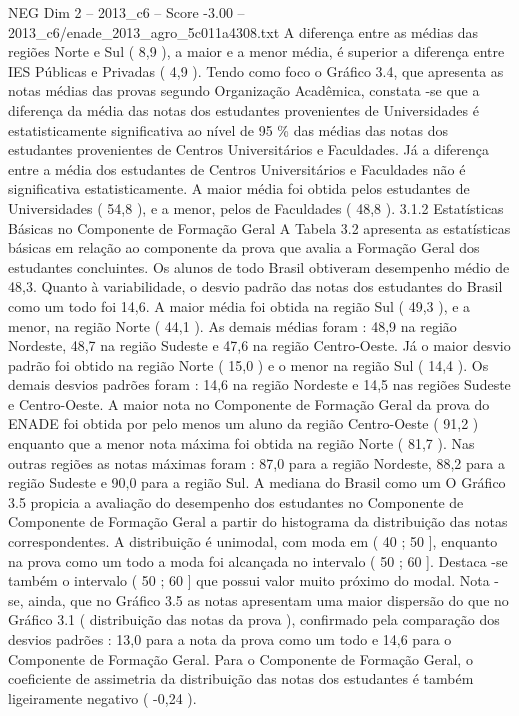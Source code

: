 \begin{textsample}{NEG Dim 2 – 2013\_c6 – Score -3.00 – 2013\_c6/enade\_2013\_agro\_5c011a4308.txt}
A diferença entre as médias das regiões Norte e Sul ( 8,9 ), a maior e a menor média, é superior a diferença entre IES Públicas e Privadas ( 4,9 ).
Tendo como foco o Gráfico 3.4, que apresenta as notas médias das provas segundo Organização Acadêmica, constata -se que a diferença da média das notas dos estudantes provenientes de Universidades é estatisticamente significativa ao nível de 95 \% das médias das notas dos estudantes provenientes de Centros Universitários e Faculdades.
Já a diferença entre a média dos estudantes de Centros Universitários e Faculdades não é significativa estatisticamente.
A maior média foi obtida pelos estudantes de Universidades ( 54,8 ), e a menor, pelos de Faculdades ( 48,8 ). 3.1.2 Estatísticas Básicas no Componente de Formação Geral A Tabela 3.2 apresenta as estatísticas básicas em relação ao componente da prova que avalia a Formação Geral dos estudantes concluintes.
Os alunos de todo Brasil obtiveram desempenho médio de 48,3.
Quanto à variabilidade, o desvio padrão das notas dos estudantes do Brasil como um todo foi 14,6.
A maior média foi obtida na região Sul ( 49,3 ), e a menor, na região Norte ( 44,1 ).
As demais médias foram : 48,9 na região Nordeste, 48,7 na região Sudeste e 47,6 na região Centro-Oeste.
Já o maior desvio padrão foi obtido na região Norte ( 15,0 ) e o menor na região Sul ( 14,4 ).
Os demais desvios padrões foram : 14,6 na região Nordeste e 14,5 nas regiões Sudeste e Centro-Oeste.
A maior nota no Componente de Formação Geral da prova do ENADE foi obtida por pelo menos um aluno da região Centro-Oeste ( 91,2 ) enquanto que a menor nota máxima foi obtida na região Norte ( 81,7 ).
Nas outras regiões as notas máximas foram : 87,0 para a região Nordeste, 88,2 para a região Sudeste e 90,0 para a região Sul.
A mediana do Brasil como um O Gráfico 3.5 propicia a avaliação do desempenho dos estudantes no Componente de Componente de Formação Geral a partir do histograma da distribuição das notas correspondentes.
A distribuição é unimodal, com moda em ( 40 ; 50 ], enquanto na prova como um todo a moda foi alcançada no intervalo ( 50 ; 60 ].
Destaca -se também o intervalo ( 50 ; 60 ] que possui valor muito próximo do modal.
Nota -se, ainda, que no Gráfico 3.5 as notas apresentam uma maior dispersão do que no Gráfico 3.1 ( distribuição das notas da prova ), confirmado pela comparação dos desvios padrões : 13,0 para a nota da prova como um todo e 14,6 para o Componente de Formação Geral.
Para o Componente de Formação Geral, o coeficiente de assimetria da distribuição das notas dos estudantes é também ligeiramente negativo ( -0,24 ).

\end{textsample}
